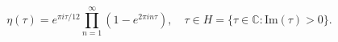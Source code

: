 $$\eta(\tau) = e^{\pi i \tau / 12} \prod_{n=1}^{\infty} (1 - e^{2 \pi i n \tau}), \quad \tau \in H = \{\tau \in \mathbb{C} : \text{Im}(\tau) > 0\}.$$
